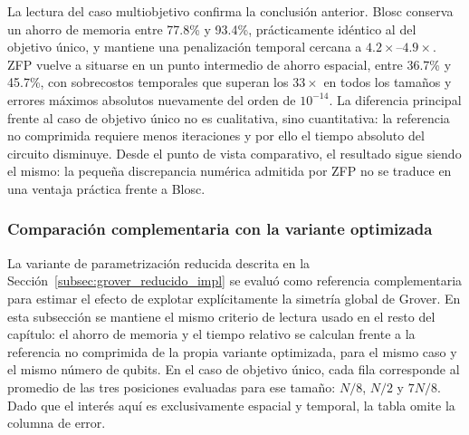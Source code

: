 La lectura del caso multiobjetivo confirma la conclusión anterior. Blosc conserva un ahorro de
memoria entre 77.8\% y 93.4\%, prácticamente idéntico al del objetivo único, y mantiene una
penalización temporal cercana a $4.2\times$--$4.9\times$. ZFP vuelve a situarse en un punto
intermedio de ahorro espacial, entre 36.7\% y 45.7\%, con sobrecostos temporales que superan
los $33\times$ en todos los tamaños y errores máximos absolutos nuevamente del orden de
$10^{-14}$. La diferencia principal frente al caso de objetivo único no es cualitativa, sino
cuantitativa: la referencia no comprimida requiere menos iteraciones y por ello el tiempo
absoluto del circuito disminuye. Desde el punto de vista comparativo, el resultado sigue
siendo el mismo: la pequeña discrepancia numérica admitida por ZFP no se traduce en una
ventaja práctica frente a Blosc.

\subsubsection{Comparación complementaria con la variante optimizada}

La variante de parametrización reducida descrita en la
Sección~\ref{subsec:grover_reducido_impl} se evaluó como referencia complementaria para
estimar el efecto de explotar explícitamente la simetría global de Grover. En esta
subsección se mantiene el mismo criterio de lectura usado en el resto del capítulo: el ahorro
de memoria y el tiempo relativo se calculan frente a la referencia no comprimida de la propia
variante optimizada, para el mismo caso y el mismo número de qubits. En el caso de objetivo
único, cada fila corresponde al promedio de las tres posiciones evaluadas para ese tamaño:
$N/8$, $N/2$ y $7N/8$. Dado que el interés aquí es exclusivamente espacial y temporal, la
tabla omite la columna de error.

